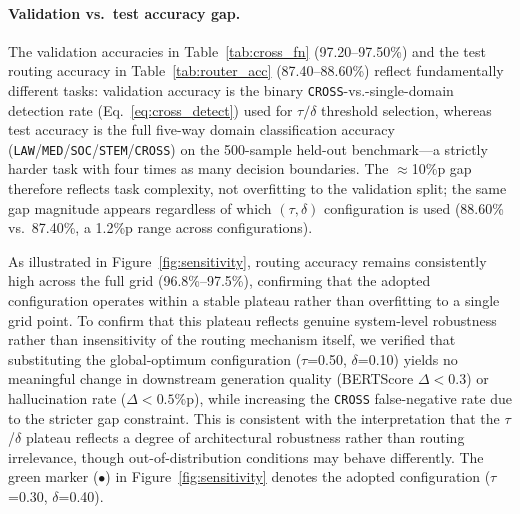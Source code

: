 \documentclass[a4paper,fleql]{cas-sc}
\begin{document}
\paragraph{Validation vs.\ test accuracy gap.}
The validation accuracies in Table~\ref{tab:cross_fn} (97.20--97.50\%) and the
test routing accuracy in Table~\ref{tab:router_acc} (87.40--88.60\%) reflect
fundamentally different tasks: validation accuracy is the binary
\texttt{CROSS}-vs.-single-domain detection rate (Eq.~\ref{eq:cross_detect})
used for $\tau/\delta$ threshold selection, whereas test accuracy is the
full five-way domain classification accuracy
(\texttt{LAW}/\texttt{MED}/\texttt{SOC}/\texttt{STEM}/\texttt{CROSS}) on the
500-sample held-out benchmark---a strictly harder task with four times as many
decision boundaries. The $\approx$10\%p gap therefore reflects task complexity,
not overfitting to the validation split; the same gap magnitude appears
regardless of which $(\tau, \delta)$ configuration is used
(88.60\% vs.\ 87.40\%, a 1.2\%p range across configurations).

As illustrated in Figure~\ref{fig:sensitivity}, routing accuracy remains
consistently high across the full grid (96.8\%--97.5\%), confirming that
the adopted configuration operates within a stable plateau rather than
overfitting to a single grid point. To confirm that this plateau reflects
genuine system-level robustness rather than insensitivity of the routing
mechanism itself, we verified that substituting the global-optimum
configuration ($\tau$=0.50, $\delta$=0.10) yields no meaningful change in
downstream generation quality (BERTScore $\Delta < 0.3$) or hallucination
rate ($\Delta < 0.5$\%p), while increasing the \texttt{CROSS}
false-negative rate due to the stricter gap constraint. This is consistent with the interpretation that
the $\tau$/$\delta$ plateau reflects a degree of architectural robustness
rather than routing irrelevance, though out-of-distribution conditions may
behave differently. The green marker ($\bullet$) in
Figure~\ref{fig:sensitivity} denotes the adopted configuration
($\tau$=0.30, $\delta$=0.40).
\end{document}
